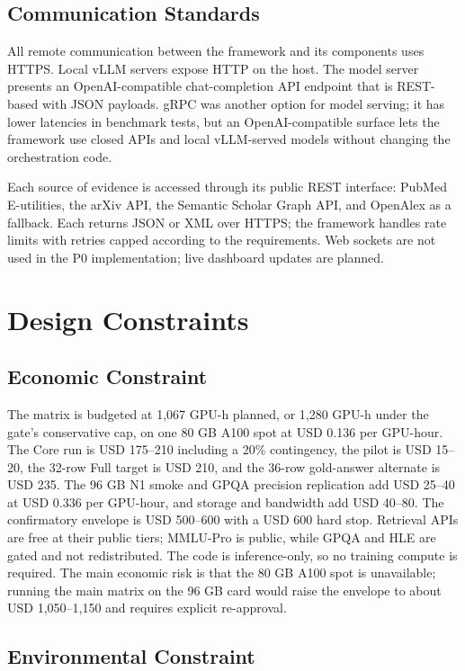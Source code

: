 \subsection{Communication Standards}

All remote communication between the framework and its components uses HTTPS. Local vLLM servers expose HTTP on the host. The model server presents an OpenAI-compatible chat-completion API endpoint that is REST-based with JSON payloads. gRPC was another option for model serving; it has lower latencies in benchmark tests, but an OpenAI-compatible surface lets the framework use closed APIs and local vLLM-served models without changing the orchestration code.

Each source of evidence is accessed through its public REST interface: PubMed E-utilities, the arXiv API, the Semantic Scholar Graph API, and OpenAlex as a fallback. Each returns JSON or XML over HTTPS; the framework handles rate limits with retries capped according to the requirements. Web sockets are not used in the P0 implementation; live dashboard updates are planned.

\section{Design Constraints}

\subsection{Economic Constraint}

The matrix is budgeted at 1,067 GPU-h planned, or 1,280 GPU-h under the gate's conservative cap, on one 80 GB A100 spot at USD 0.136 per GPU-hour. The Core run is USD 175--210 including a 20\% contingency, the pilot is USD 15--20, the 32-row Full target is USD 210, and the 36-row gold-answer alternate is USD 235. The 96 GB N1 smoke and GPQA precision replication add USD 25--40 at USD 0.336 per GPU-hour, and storage and bandwidth add USD 40--80. The confirmatory envelope is USD 500--600 with a USD 600 hard stop. Retrieval APIs are free at their public tiers; MMLU-Pro is public, while GPQA and HLE are gated and not redistributed. The code is inference-only, so no training compute is required. The main economic risk is that the 80 GB A100 spot is unavailable; running the main matrix on the 96 GB card would raise the envelope to about USD 1,050--1,150 and requires explicit re-approval.

\subsection{Environmental Constraint}

